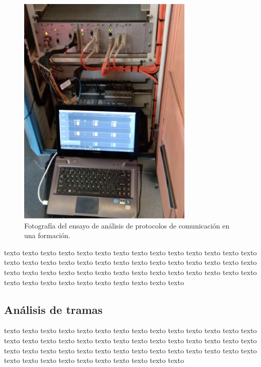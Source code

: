\documentclass[
11pt, %
]{charter}
\begin{document}
\begin{figure}[htpb]
\centering 
\includegraphics[width=0.75\textwidth]{./Pics/IMG_20210414_104653.jpg}
\caption{Fotografía del ensayo de análisis de protocolos de comunicación en una formación.}
\label{fig:sniffingPhoto}
\end{figure}

texto texto texto texto texto texto texto texto texto texto texto texto texto texto texto texto texto texto texto texto texto texto texto texto texto texto texto texto texto texto texto texto texto texto texto texto texto texto texto texto texto texto texto texto texto texto texto texto texto texto texto texto 



\pagebreak
\subsection{Análisis de tramas}

texto texto texto texto texto texto texto texto texto texto texto texto texto texto texto texto texto texto texto texto texto texto texto texto texto texto texto texto texto texto texto texto texto texto texto texto texto texto texto texto texto texto texto texto texto texto texto texto texto texto texto texto 
\end{document}
